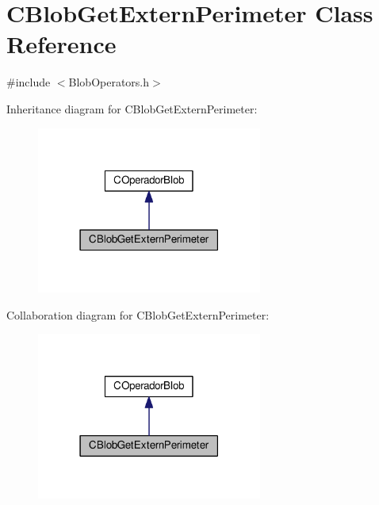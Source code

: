 \hypertarget{classCBlobGetExternPerimeter}{\section{C\-Blob\-Get\-Extern\-Perimeter Class Reference}
\label{classCBlobGetExternPerimeter}
}


{\ttfamily \#include $<$Blob\-Operators.\-h$>$}



Inheritance diagram for C\-Blob\-Get\-Extern\-Perimeter\-:\nopagebreak
\begin{figure}[H]
\begin{center}
\leavevmode
\includegraphics[width=210pt]{classCBlobGetExternPerimeter__inherit__graph}
\end{center}
\end{figure}


Collaboration diagram for C\-Blob\-Get\-Extern\-Perimeter\-:\nopagebreak
\begin{figure}[H]
\begin{center}
\leavevmode
\includegraphics[width=210pt]{classCBlobGetExternPerimeter__coll__graph}
\end{center}
\end{figure}
